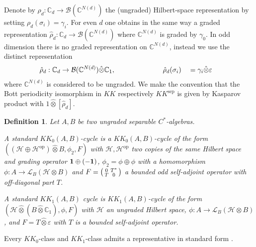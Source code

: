 \documentclass[12pt]{amsart}
\newtheorem{definition}[theorem]{Definition}
\newcommand{\CM}{{\mathbb C}}
\newcommand{\Bb}{{\mathcal B}}
\newcommand{\Ll}{{\mathcal L}}
\newcommand{\Hh}{{\mathcal H}}
\newcommand{\one}{{\bf 1}}
\newcommand{\ep}{\varepsilon}
\begin{document}
Denote by $\rho_d:\CM_d \to \Bb(\CM^{N(d)})$ the (ungraded) Hilbert-space representation by setting 
$\rho_d(\sigma_i) = \gamma_i$. For even $d$ one obtains in the same way a graded representation $\hat{\rho}_d: \CM_d\to \Bb(\CM^{N(d)})$ 
where $\CM^{N(d)}$ is graded by $\gamma_0$. In odd dimension there is no graded representation on $\CM^{N(d)}$, instead we use the distinct representation
\begin{alignat*}{2}
&\hat{\rho}_d: \CM_{d} \to \Bb(\CM^{N(d)})\hat{\otimes} \CM_1, \qquad \hspace{1.7cm} \hat{\rho}_d(\sigma_i) &&= \gamma_i \hat{\otimes} \ep
\end{alignat*} 
where $\CM^{N(d)}$ is considered to be ungraded. We make the convention that the Bott periodicity isomorphism in $KK$ respectively $KK^{\mathrm{sep}}$ is given by Kasparov product with $1\hat{\otimes}[\hat{\rho}_d]$.

\begin{definition}
Let $A,B$ be two ungraded separable $C^*$-algebras.

A standard $KK_0(A,B)$-cycle is a $KK_0(A,B)$-cycle of the form $((\Hh\oplus \Hh^{\mathrm{op}})\hat{\otimes} B, \phi_2, F)$ with $\Hh, \Hh^{\mathrm{op}}$ two copies of the same Hilbert space and grading operator $\one\oplus (-\one)$, $\phi_2=\phi\oplus \phi$ with a homomorphism $\phi: A \to \Ll_B(\Hh\otimes B)$ and $F=\begin{psmallmatrix}
    0 & T^* \\ T & 0
\end{psmallmatrix}$ a bounded odd self-adjoint operator with off-diagonal part $T$.

A standard $KK_1(A,B)$ cycle is $KK_1(A,B)$-cycle of the form $(\Hh\hat{\otimes}(B\hat{\otimes}\CM_1), \phi, F)$ with $\Hh$ an ungraded Hilbert space, $\phi:A\to \Ll_B(\Hh\otimes B)$, and $F=T\hat{\otimes}\ep$ with $T$ is a bounded self-adjoint operator.
\end{definition}
Every $KK_0$-class and $KK_1$-class admits a representative in standard form \cite{blackadar1998k}.
\end{document}
